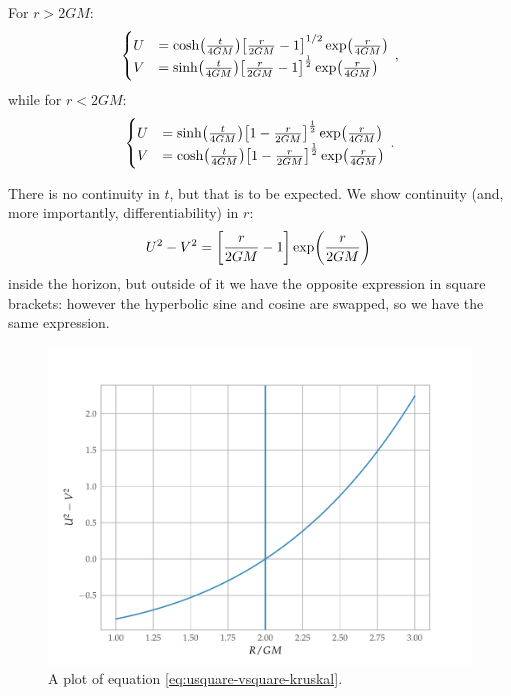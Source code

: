 \documentclass[main.tex]{subfiles}
\begin{document}
For \(r>2GM\):
%
\begin{subequations}
\begin{align}
  \begin{cases}
      U &= \cosh(\frac{t}{4GM} ) \qty[\frac{r}{2GM} - 1]^{1/2} \exp(\frac{r}{4GM})  \\
      V &= \sinh(\frac{t}{4GM}) \qty[\frac{r}{2GM} - 1]^{\frac{1}{2}} \exp(\frac{r}{4GM})
  \end{cases}
\,,
\end{align}
\end{subequations}
%
while for \(r< 2GM\): 
%
\begin{subequations}
\begin{align}
  \begin{cases}
      U &= \sinh(\frac{t}{4GM}) \qty[1 - \frac{r}{2GM}]^{\frac{1}{2}} \exp(\frac{r}{4GM}) \\
      V &= \cosh(\frac{t}{4GM}) \qty[1 - \frac{r}{2GM}]^{\frac{1}{2}} \exp(\frac{r}{4GM}) 
  \end{cases}
\,.
\end{align}
\end{subequations}

There is no continuity in \(t\), but that is to be expected. We show continuity (and, more importantly, differentiability) in \(r\): 
%
\begin{align} \label{eq:usquare-vsquare-kruskal}
  U^2 - V^2 = \qty[\frac{r}{2GM}- 1] \exp(\frac{r}{2GM})
\,
\end{align}
%
inside the horizon, but outside of it we have the opposite expression in square brackets: however the hyperbolic sine and cosine are swapped, so we have the same expression. 

\begin{figure}[H]
\centering
\includegraphics[width=\textwidth]{figures/rindlerU2-V2.pdf}
\caption{A plot of equation \eqref{eq:usquare-vsquare-kruskal}.}
\label{fig:rindlerU2-V2}
\end{figure}
  
\end{document}
